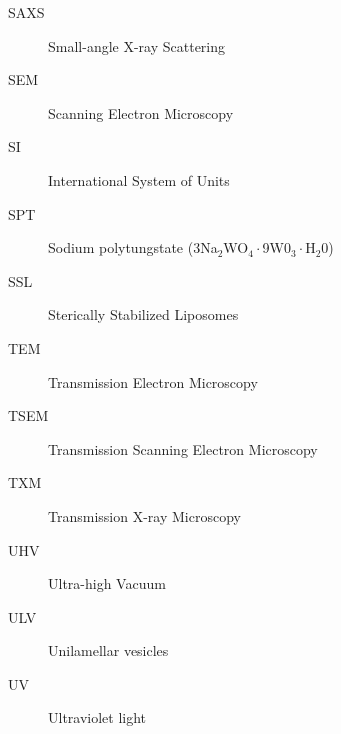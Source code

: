 {\begin{description}
        \item   [SAXS] Small-angle X-ray Scattering
        \item   [SEM] Scanning Electron Microscopy
        \item   [SI] International System of Units
        \item   [SPT] Sodium polytungstate (3Na$_2$WO$_4\cdot$9W0$_3\cdot$H$_2$0)
        \item   [SSL] Sterically Stabilized Liposomes
        \item   [TEM] Transmission Electron Microscopy
        \item   [TSEM] Transmission Scanning Electron Microscopy
        \item   [TXM] Transmission X-ray Microscopy  
        \item   [UHV] Ultra-high Vacuum      
        \item   [ULV] Unilamellar vesicles
        \item   [UV] Ultraviolet light

        

\end{description}
}

\cleardoublepage
